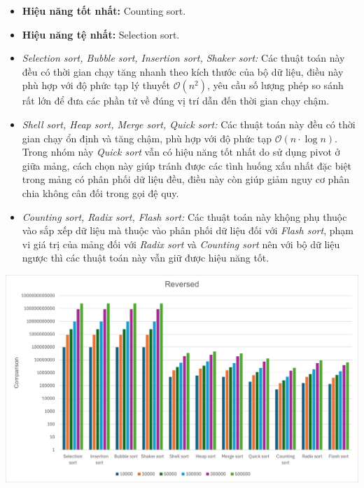     \begin{itemize}
        \item \textbf{Hiệu năng tốt nhất:} Counting sort.
        \item \textbf{Hiệu năng tệ nhất:} Selection sort. 
        \item \textit{Selection sort, Bubble sort, Insertion sort, Shaker sort:} Các thuật toán này đều có thời gian chạy tăng nhanh theo kích thước của bộ dữ liệu, điều này phù hợp với độ phức tạp lý thuyết $\mathcal{O}(n^2)$, yêu cầu số lượng phép so sánh rất lớn để đưa các phần tử về đúng vị trí dẫn đến thời gian chạy chậm.
        \item \textit{Shell sort, Heap sort, Merge sort, Quick sort:} Các thuật toán này đều có thời gian chạy ổn định và tăng chậm, phù hợp với độ phức tạp $\mathcal{O}(n \cdot \log n)$. Trong nhóm này \textit{Quick sort} vẫn có hiệu năng tốt nhất do sử dụng pivot ở giữa mảng, cách chọn này giúp tránh được các tình huống xấu nhất đặc biệt trong mảng có phân phối dữ liệu đều, điều này còn giúp giảm nguy cơ phân chia không cân đối trong gọi đệ quy.
        \item \textit{Counting sort, Radix sort, Flash sort:} Các thuật toán này khộng phụ thuộc vào sắp xếp dữ liệu mà thuộc vào phân phối dữ liệu đối với \textit{Flash sort}, phạm vi giá trị của mảng đối với \textit{Radix sort} và \textit{Counting sort} nên với bộ dữ liệu ngược thì các thuật toán này vẫn giữ được hiệu năng tốt.
    \end{itemize}

    \includegraphics[width = 1\linewidth]{img/experiment/comparison/reversed.png}

